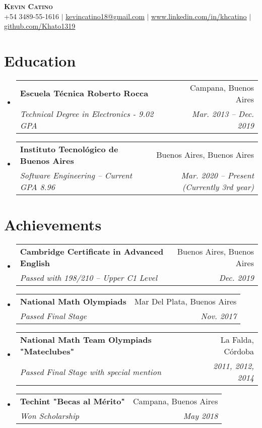 \documentclass[letterpaper,11pt]{article}
\makeatletter
\newcommand{\resumeSubheading}[4]{
  \vspace{-2pt}\item
    \begin{tabular*}{0.97\textwidth}[t]{l@{\extracolsep{\fill}}r}
      \textbf{#1} & #2 \\
      \textit{\small#3} & \textit{\small #4} \\
    \end{tabular*}\vspace{-7pt}
}
\newcommand{\resumeSubHeadingListStart}{\begin{itemize}[leftmargin=0.15in, label={}]}
\newcommand{\resumeSubHeadingListEnd}{\end{itemize}}
\makeatother
\begin{document}

\begin{center}
    \textbf{\Huge \scshape Kevin Catino} \\ \vspace{1pt}
    \small +54 3489-55-1616 $|$ \href{mailto:x@x.com}{\underline{kevincatino18@gmail.com}} $|$ 
    \href{https://www.linkedin.com/in/khcatino}{\underline{www.linkedin.com/in/khcatino}} $|$
    \href{https://github.com/Khato1319}{\underline{github.com/Khato1319}}
\end{center}


\section{Education}
  \resumeSubHeadingListStart
    \resumeSubheading
      {Escuela Técnica Roberto Rocca}{Campana, Buenos Aires}
      {Technical Degree in Electronics - 9.02 GPA}{Mar. 2013 -- Dec. 2019}
    \resumeSubheading
      {Instituto Tecnológico de Buenos Aires}{Buenos Aires, Buenos Aires}
      {Software Engineering -- Current GPA 8.96}{Mar. 2020 -- Present (Currently 3rd year)}
  \resumeSubHeadingListEnd


\section{Achievements}
\resumeSubHeadingListStart
\resumeSubheading
    {Cambridge Certificate in Advanced English}{Buenos Aires, Buenos Aires}
    {Passed with 198/210 -- Upper C1 Level}{Dec. 2019}
  \resumeSubheading
    {National Math Olympiads}{Mar Del Plata, Buenos Aires}
    {Passed Final Stage}{Nov. 2017}
    \resumeSubheading
    {National Math Team Olympiads "Mateclubes"}{La Falda, Córdoba}
    {Passed Final Stage with special mention}{2011, 2012, 2014}
  \resumeSubheading
    {Techint "Becas al Mérito"}{Campana, Buenos Aires}
    {Won Scholarship}{May 2018}
\resumeSubHeadingListEnd
\end{document}
